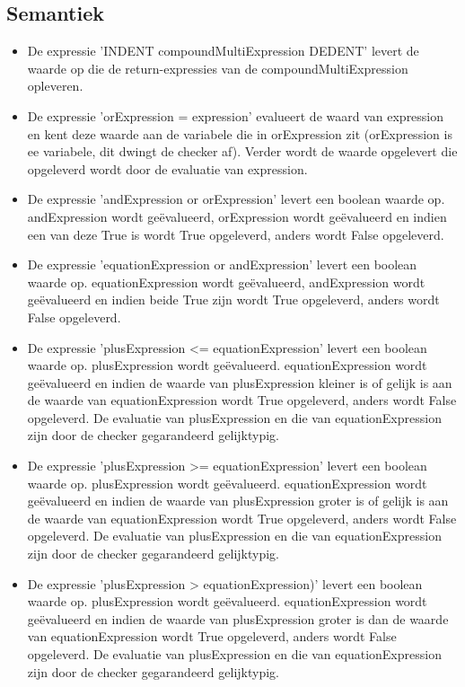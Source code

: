     \subsection{Semantiek}
        \begin{itemize}
        \item De expressie 'INDENT compoundMultiExpression DEDENT' levert de waarde op die de return-expressies van de compoundMultiExpression opleveren.
        \item De expressie 'orExpression = expression' evalueert de waard van expression en kent deze waarde aan de variabele die in orExpression zit (orExpression is ee variabele, dit dwingt de checker af). Verder wordt de waarde opgelevert die opgeleverd wordt door de evaluatie van expression.
        \item De expressie 'andExpression or orExpression' levert een boolean waarde op. andExpression wordt ge\"{e}valueerd, orExpression wordt ge\"{e}valueerd en indien een van deze True is wordt True opgeleverd, anders wordt False opgeleverd.
        \item De expressie 'equationExpression or andExpression' levert een boolean waarde op. equationExpression wordt ge\"{e}valueerd, andExpression wordt ge\"{e}valueerd en indien beide True zijn wordt True opgeleverd, anders wordt False opgeleverd.
        \item De expressie 'plusExpression \textless{}= equationExpression' levert een boolean waarde op. plusExpression wordt ge\"{e}valueerd. equationExpression wordt ge\"{e}valueerd en indien de waarde van plusExpression kleiner is of gelijk is aan de waarde van equationExpression wordt True opgeleverd, anders wordt False opgeleverd. De evaluatie van plusExpression en die van equationExpression zijn door de checker gegarandeerd gelijktypig.
        \item De expressie 'plusExpression \textgreater{}= equationExpression' levert een boolean waarde op. plusExpression wordt ge\"{e}valueerd. equationExpression wordt ge\"{e}valueerd en indien de waarde van plusExpression groter is of gelijk is aan de waarde van equationExpression wordt True opgeleverd, anders wordt False opgeleverd. De evaluatie van plusExpression en die van equationExpression zijn door de checker gegarandeerd gelijktypig.
        \item De expressie 'plusExpression \textgreater{} equationExpression)' levert een boolean waarde op. plusExpression wordt ge\"{e}valueerd. equationExpression wordt ge\"{e}valueerd en indien de waarde van plusExpression groter is dan de waarde van equationExpression wordt True opgeleverd, anders wordt False opgeleverd. De evaluatie van plusExpression en die van equationExpression zijn door de checker gegarandeerd gelijktypig.

\end{itemize}
